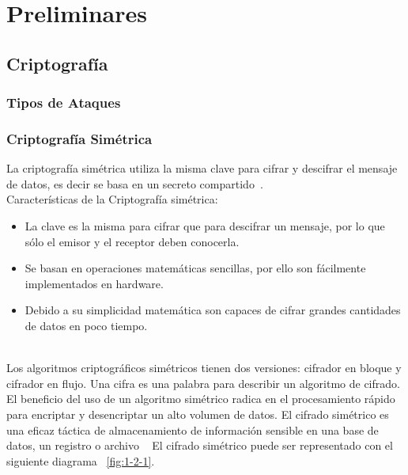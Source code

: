 \chapter{Preliminares} %

\section{Criptografía}

\subsection{Tipos de Ataques}


\subsection{Criptografía Simétrica}
La criptografía simétrica utiliza la misma clave para cifrar y descifrar el mensaje de datos, es decir se basa en un secreto compartido~\cite{criptosimetrica}. \\ Características de la Criptografía simétrica: \begin{itemize}
	\item La clave es la misma para cifrar que para descifrar un mensaje, por lo que sólo el emisor y el receptor deben conocerla.
	\item Se basan en operaciones matemáticas sencillas, por ello son fácilmente implementados en hardware.
	\item Debido a su simplicidad matemática son capaces de cifrar grandes cantidades de datos en poco tiempo.
			       \end{itemize} ~\cite{sime} \\
Los algoritmos criptográficos simétricos tienen dos versiones: cifrador en bloque y cifrador en flujo. Una cifra es una palabra para describir un algoritmo de cifrado. El beneficio del uso de un algoritmo simétrico radica en el procesamiento rápido
para encriptar y desencriptar un alto volumen de datos. El cifrado simétrico es una eficaz táctica de almacenamiento de información
sensible en una base de datos, un registro o archivo ~\cite{sime} El cifrado simétrico puede ser representado con el siguiente diagrama ~\ref{fig:1-2-1}.

